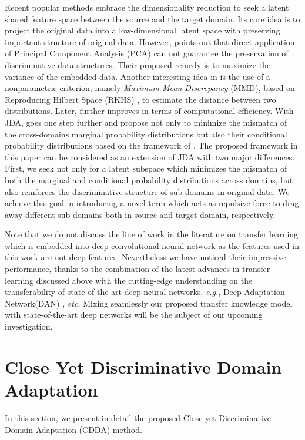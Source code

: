 \documentclass[10pt,twocolumn,letterpaper]{article}
\begin{document}
\begin{CJK*}{UTF8}{gkai}
Recent popular methods embrace the dimensionality reduction  to seek a latent shared feature space between the source and the target domain. Its core idea is to project the original data into a low-dimensional latent space  with preserving important structure of original data. However,  \cite{pan2008transfer} points out that direct application of Principal Component Analysis (PCA) can not guarantee the preservation of  discriminative data structures. Their proposed remedy is to maximize the variance of the embedded data. Another interesting idea in  \cite{pan2008transfer} is the use of a nonparametric criterion, namely  \textit{Maximum Mean Discrepancy} (MMD),  based on Reproducing Hilbert Space (RKHS) \cite{borgwardt2006integrating}, to estimate the distance between two distributions. Later, \cite{pan2011domain} further improves \cite{pan2008transfer}  in terms of  computational efficiency. With JDA,  \cite{long2013transfer} goes one step further and propose not only to minimize the mismatch of the  cross-domains marginal probability distributions but also their conditional probability distributions  based on the framework of \cite{pan2008transfer,pan2011domain}. The proposed framework in this paper can be considered as an extension of JDA with two major differences. First, we seek not only for a latent subspace which minimizes the mismatch of both the marginal and conditional probability distributions across domains, but also reinforces the discriminative structure of sub-domains in original data. We achieve this goal in introducing a novel term which acts as repulsive force to drag away different sub-domains both in source and target domain, respectively. 

Note that we do not discuss the line of work in the literature on transfer learning which is embedded into deep convolutional neural network as the features used in this work are not deep features; Nevertheless we have noticed their impressive performance, thanks to the combination of the  latest advances in transfer learning discussed above with the cutting-edge  understanding on the transferability  \cite{glorot2011domain} of state-of-the-art deep neural networks, \textit{e.g.},  Deep Adaptation Network(DAN) \cite{long2015learning},  \textit{etc.} Mixing seamlessly our proposed transfer knowledge model with state-of-the-art deep networks will be the subject of our upcoming investigation. 
\vspace{-5pt}



\section{Close Yet Discriminative Domain Adaptation}
In this section, we present in detail the proposed Close yet Discriminative Domain Adaptation (CDDA) method.


\end{CJK*}
\end{document}
